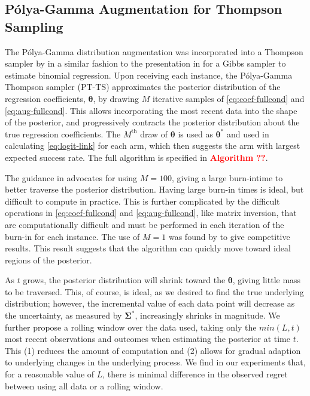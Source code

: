 \documentclass[12pt]{article}
\newcommand{\bred}[1]{\textbf{\textcolor{red}{#1}}}
\begin{document}
\subsection{P\'olya-Gamma Augmentation for Thompson Sampling}

The P\'olya-Gamma distribution augmentation was incorporated into a Thompson 
sampler by \cite{dumitrascu2018pg} in a similar fashion to the presentation in 
\cite{polson2013bayesian} for a Gibbs sampler to estimate binomial regression. 
Upon receiving each instance, the P\'olya-Gamma Thompson sampler (PT-TS)
approximates the posterior distribution of the regression coefficients, 
$\bm{\theta}$, by drawing $M$ iterative samples of \eqref{eq:coef-fullcond} and
\eqref{eq:aug-fullcond}.
This allows incorporating the most recent data into the shape of the posterior,
and progressively contracts the posterior distribution about the true regression
coefficients.
The $M^{\text{th}}$ draw of $\bm{\theta}$ is used as $\bm{\theta}^*$ and used
in calculating \eqref{eq:logit-link} for each arm, which then suggests the arm 
with largest expected success rate.  
The full algorithm is specified in \bred{Algorithm ??}.

The guidance in \cite{dumitrascu2018pg} advocates for using $M = 100$, giving a 
large burn-intime to better traverse the posterior distribution.
Having large burn-in times is ideal, but difficult to compute in practice.
This is further complicated by the difficult operations in \eqref{eq:coef-fullcond}
and \eqref{eq:aug-fullcond}, like matrix inversion, that are computationally 
difficult and must be performed in each iteration of the burn-in for each instance.
The use of $M = 1$ was found by \cite{dumitrascu2018pg} to give competitive results.
This result suggests that the algorithm can quickly move toward ideal regions of
the posterior.

As $t$ grows, the posterior distribution will shrink toward the $\bm{\theta}$, 
giving little mass to be traversed. 
This, of course, is ideal, as we desired to find the true underlying distribution;
however, the incremental value of each data point will decrease as the uncertainty,
as measured by $\bm{\Sigma}^*$, increasingly shrinks in magnitude.
We further propose a rolling window over the data used, taking only the $min(L,t)$ 
most recent observations and outcomes when estimating the posterior at time $t$.
This (1) reduces the amount of computation and (2) allows for gradual adaption to 
underlying changes in the underlying process.
We find in our experiments that, for a reasonable value of $L$, there is minimal 
difference in the observed regret between using all data or a rolling window.
\end{document}
